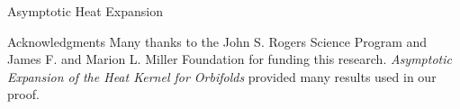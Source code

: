 \documentclass[final]{beamer}
\newlength{\onecolwid}
\begin{document}
\begin{frame}[t]
\begin{columns}[t]
\begin{column}{\onecolwid}
\begin{block}{Asymptotic Heat Expansion}
    \end{block}
    
    \begin{block}{\normalsize{Acknowledgments}}
    Many thanks to the John S. Rogers Science Program and James F. and Marion L. Miller Foundation for funding this research. 
    \textit{Asymptotic Expansion of the Heat Kernel for
    Orbifolds} provided many results used in our proof.
    \end{block}

    \end{column}
\end{columns}
\end{frame}
\end{document}
